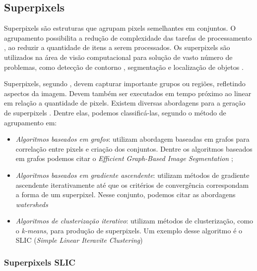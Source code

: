 \begin{document}

\subsection{Superpixels} \label{ssec:superpixels}

Superpixels são estruturas que agrupam pixels semelhantes em conjuntos. O agrupamento possibilita a redução de complexidade das tarefas de processamento \cite{SLIC}, ao reduzir a quantidade de itens a serem processados. Os superpixels são utilizados na área de visão computacional para solução de vasto número de problemas, como detecção de contorno \cite{CONTOUR}, segmentação \cite{SEG_MERGE} e localização de objetos \cite{SEG_LOCALIZ}.

Superpixels, segundo \cite{FELZENSZWALB}, devem capturar importante grupos ou regiões, refletindo aspectos da imagem. Devem também ser executados em tempo próximo ao linear em relação a quantidade de pixels. Existem diversas abordagens para a geração de superpixels \cite{SLIC}. Dentre elas, podemos classificá-las, segundo o método de agrupamento em: 

\begin{itemize}
 \item \textit{Algoritmos baseados em grafos}: utilizam abordagem baseadas em grafos para correlação entre pixels e criação dos conjuntos. Dentre os algoritmos baseados em grafos podemos citar o \textit{Efficient Graph-Based Image Segmentation} \cite{FELZENSZWALB};
 \item \textit{Algoritmos baseados em gradiente ascendente}: utilizam métodos de gradiente ascendente iterativamente até que os critérios de convergência correspondam a forma de um superpixel. Nesse conjunto, podemos  citar as abordagens \textit{watersheds} \cite{WATERSHEDS} \cite{SLIC}
 \item \textit{Algoritmos de clusterização iterativo}: utilizam métodos de clusterização, como o \textit{k-means}, para produção de superpixels. Um exemplo desse algoritmo é o SLIC (\textit{Simple Linear Iteravite Clustering}) \cite{SLIC}
\end{itemize}


\subsubsection{Superpixels SLIC} \label{sssec:slic}
\end{document}
